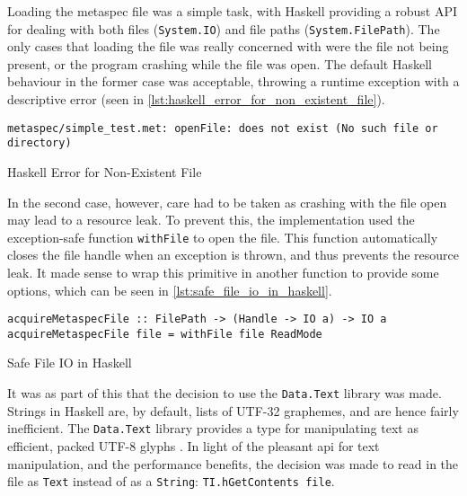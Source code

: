 Loading the metaspec file was a simple task, with Haskell providing a robust API for dealing with both files (\texttt{System.IO}) and file paths (\texttt{System.FilePath}). 
The only cases that loading the file was really concerned with were the file not being present, or the program crashing while the file was open.
The default Haskell behaviour in the former case was acceptable, throwing a runtime exception with a descriptive error (seen in \autoref{lst:haskell_error_for_non_existent_file}).\\

\begin{listing}[!htb]
\begin{verbatim}
metaspec/simple_test.met: openFile: does not exist (No such file or directory)
\end{verbatim}
\caption{Haskell Error for Non-Existent File}
\label{lst:haskell_error_for_non_existent_file}
\end{listing}

In the second case, however, care had to be taken as crashing with the file open may lead to a resource leak. 
To prevent this, the implementation used the exception-safe function \texttt{withFile} to open the file.
This function automatically closes the file handle when an exception is thrown, and thus prevents the resource leak.
It made sense to wrap this primitive in another function to provide some options, which can be seen in \autoref{lst:safe_file_io_in_haskell}.

\begin{listing}[!htb]
\begin{verbatim}
acquireMetaspecFile :: FilePath -> (Handle -> IO a) -> IO a
acquireMetaspecFile file = withFile file ReadMode
\end{verbatim}
\caption{Safe File IO in Haskell}
\label{lst:safe_file_io_in_haskell}
\end{listing}

It was as part of this that the decision to use the \texttt{Data.Text} library was made. 
Strings in Haskell are, by default, lists of UTF-32 graphemes, and are hence fairly inefficient. 
The \texttt{Data.Text} library provides a type for manipulating text as efficient, packed UTF-8 glyphs \citep{haskell_data_text}.
In light of the pleasant \gls{api} for text manipulation, and the performance benefits, the decision was made to read in the file as \texttt{Text} instead of as a \texttt{String}: \texttt{TI.hGetContents file}.\\

